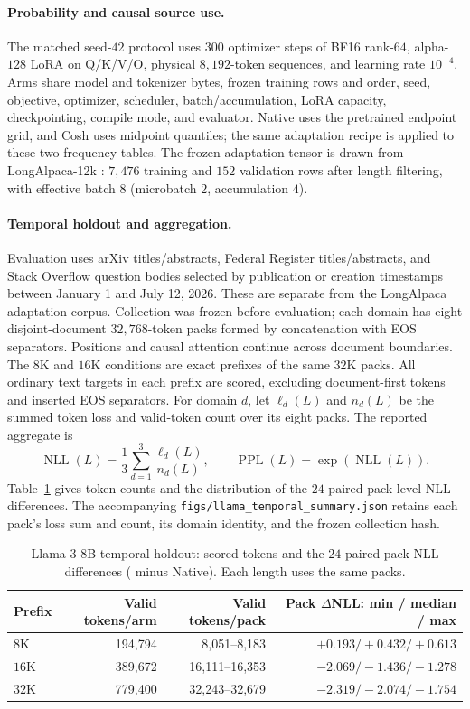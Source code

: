 \paragraph{Probability and causal source use.}
The matched seed-$42$ protocol uses $300$ optimizer steps of BF16 rank-$64$,
alpha-$128$ LoRA on Q/K/V/O, physical $8{,}192$-token sequences, and learning
rate $10^{-4}$. Arms share model and tokenizer bytes, frozen training rows and
order, seed, objective, optimizer, scheduler, batch/accumulation, LoRA capacity,
checkpointing, compile mode, and evaluator. Native uses the pretrained
endpoint grid, and Cosh uses midpoint quantiles; the same adaptation recipe is
applied to these two frequency tables.
The frozen adaptation tensor is drawn from LongAlpaca-12k
\citep{chen2023longlora}: $7{,}476$ training and $152$ validation rows after
length filtering, with effective batch $8$ (microbatch $2$, accumulation $4$).

\paragraph{Temporal holdout and aggregation.}
Evaluation uses arXiv titles/abstracts, Federal Register titles/abstracts, and
Stack Overflow question bodies selected by publication or creation timestamps
between January 1 and July 12, 2026. These are separate from the LongAlpaca
adaptation corpus. Collection was frozen before evaluation; each domain has
eight disjoint-document $32{,}768$-token packs formed by concatenation with EOS
separators. Positions and causal attention continue across document boundaries.
The $8$K and $16$K conditions are exact prefixes of the same $32$K packs.
All ordinary text targets in each prefix are scored, excluding document-first
tokens and inserted EOS separators. For domain $d$, let $\ell_d(L)$ and
$n_d(L)$ be the summed token loss and valid-token count over its eight packs.
The reported aggregate is
\[
\operatorname{NLL}(L)=\frac13\sum_{d=1}^{3}\frac{\ell_d(L)}{n_d(L)},
\qquad \operatorname{PPL}(L)=\exp(\operatorname{NLL}(L)).
\]
Table~\ref{tab:llama-temporal-protocol} gives token counts and the distribution
of the $24$ paired pack-level NLL differences. The accompanying
\texttt{figs/llama\_temporal\_summary.json} retains each pack's loss sum and count,
its domain identity, and the frozen collection hash.

\begin{table}[ht]
\centering\small
\caption{Llama-$3$-$8$B temporal holdout: scored tokens and the $24$ paired
pack NLL differences (\evq{} minus Native). Each length uses the same packs.}
\label{tab:llama-temporal-protocol}
\begin{tabular}{@{}lrrr@{}}
\toprule
Prefix & Valid tokens/arm & Valid tokens/pack & Pack $\Delta$NLL: min / median / max \\
\midrule
$8$K & 194,794 & 8,051--8,183 & $+0.193 / +0.432 / +0.613$ \\
$16$K & 389,672 & 16,111--16,353 & $-2.069 / -1.436 / -1.278$ \\
$32$K & 779,400 & 32,243--32,679 & $-2.319 / -2.074 / -1.754$ \\
\bottomrule
\end{tabular}
\end{table}
\FloatBarrier

